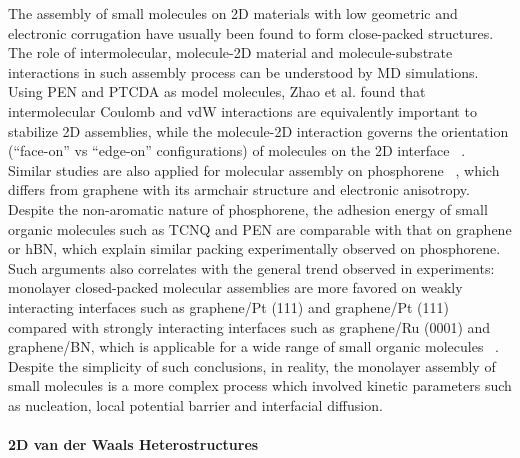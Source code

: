 The assembly of small molecules on 2D materials with low geometric and
electronic corrugation have usually been found to form close-packed
structures. The role of intermolecular, molecule-2D material and
molecule-substrate interactions in such assembly process can be
understood by MD simulations. Using PEN and PTCDA as model molecules,
Zhao et al. found that inter\-molecular Coulomb and vdW interactions
are equivalently important to stabilize 2D assemblies, while the
molecule-2D interaction governs the orientation (\ie ``face-on'' vs
``edge-on'' configurations) of molecules on the 2D interface
~\cite{Zhao_2015_self_assemb_gr_MD}. Similar studies are also applied
for molecular assembly on phosphorene
~\cite{Mukhopadhyay_2017_cryst_BP}, which differs from graphene with
its armchair structure and electronic anisotropy. Despite the
non-aromatic nature of phosphorene, the adhesion energy of small
organic molecules such as TCNQ and PEN are comparable with that on
graphene or hBN, which explain similar packing experimentally observed
on phosphorene. Such arguments also correlates with the general trend
observed in experiments: monolayer closed-packed molecular assemblies
are more favored on weakly interacting interfaces such as graphene/Pt
(111) and graphene/Pt (111) compared with strongly interacting
interfaces such as graphene/\allowbreak{}Ru (0001) and graphene/BN, which is applicable for a wide
range of small organic molecules ~\cite{Hamalainen_2012_CoPc_gr_Ir,Xiao_2013_jacs_CuPc_gr,Barja_2010_TCNQ_gr, Jung_2014_C60_gr_Cu,Yang_2012_MPc_gr_metal,Barja_2010_TCNQ_gr,Hamalainen_2012_CoPc_gr_Ir,Tsai_2015_TCNQ_gr_hbn,Stradi_2014_TCNQ_gr_Ru}.
%
Despite the simplicity of such conclusions, in reality, the monolayer
assembly of small molecules is a more complex process which involved
kinetic parameters such as nucleation, local potential barrier and
interfacial diffusion.


\paragraph{2D van der Waals Heterostructures}
\label{sec:org77ea5bc}

